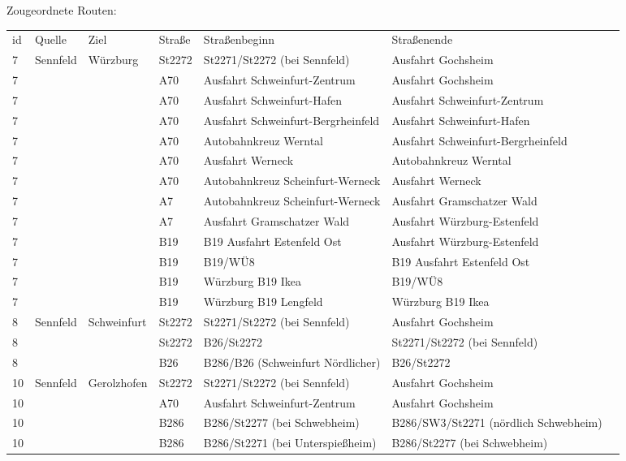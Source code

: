 Zougeordnete Routen:
\newline
\newline
\begin{tabular}{|l|l|l|l|l|l|l|}
    \hline
    id & Quelle & Ziel & Straße & Straßenbeginn & Straßenende\\ 
    7 & Sennfeld & Würzburg & St2272 & St2271/St2272 (bei Sennfeld) & Ausfahrt Gochsheim\\ 
    7 &  &  & A70 & Ausfahrt Schweinfurt-Zentrum & Ausfahrt Gochsheim\\ 
    7 &  &  & A70 & Ausfahrt Schweinfurt-Hafen & Ausfahrt Schweinfurt-Zentrum\\ 
    7 &  &  & A70 & Ausfahrt Schweinfurt-Bergrheinfeld & Ausfahrt Schweinfurt-Hafen\\ 
    7 &  &  & A70 & Autobahnkreuz Werntal & Ausfahrt Schweinfurt-Bergrheinfeld\\ 
    7 &  &  & A70 & Ausfahrt Werneck & Autobahnkreuz Werntal\\ 
    7 &  &  & A70 & Autobahnkreuz Scheinfurt-Werneck & Ausfahrt Werneck\\ 
    7 &  &  & A7 & Autobahnkreuz Scheinfurt-Werneck & Ausfahrt Gramschatzer Wald\\ 
    7 &  &  & A7 & Ausfahrt Gramschatzer Wald & Ausfahrt Würzburg-Estenfeld\\ 
    7 &  &  & B19 & B19 Ausfahrt Estenfeld Ost & Ausfahrt Würzburg-Estenfeld\\ 
    7 &  &  & B19 & B19/WÜ8 & B19 Ausfahrt Estenfeld Ost\\ 
    7 &  &  & B19 & Würzburg B19 Ikea & B19/WÜ8\\ 
    7 &  &  & B19 & Würzburg B19 Lengfeld & Würzburg B19 Ikea\\ 
    \hline
    8 & Sennfeld & Schweinfurt & St2272 & St2271/St2272 (bei Sennfeld) & Ausfahrt Gochsheim\\ 
    8 &  &  & St2272 & B26/St2272 & St2271/St2272 (bei Sennfeld)\\ 
    8 &  &  & B26 & B286/B26 (Schweinfurt Nördlicher) & B26/St2272\\ 
    \hline
    10 & Sennfeld & Gerolzhofen & St2272 & St2271/St2272 (bei Sennfeld) & Ausfahrt Gochsheim\\ 
    10 &  &  & A70 & Ausfahrt Schweinfurt-Zentrum & Ausfahrt Gochsheim\\ 
    10 &  &  & B286 & B286/St2277 (bei Schwebheim) & B286/SW3/St2271 (nördlich Schwebheim)\\ 
    10 &  &  & B286 & B286/St2271 (bei Unterspießheim) & B286/St2277 (bei Schwebheim)\\ 

\end{tabular}
